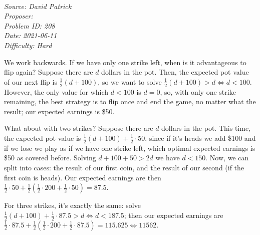 \SSbreak\\
\emph{Source: David Patrick}\\
\emph{Proposer: \Paiya}\\ %
\emph{Problem ID: 208}\\
\emph{Date: 2021-06-11}\\
\emph{Difficulty: Hard}\\
\SSbreak

\bigskip

\begin{solution}\hfil\medskip
  
    We work backwards. If we have only one strike left, when is it advantageous to flip again? Suppose there are $d$ dollars in the pot. Then, the expected 
	pot value of our next flip is $\frac{1}{2}(d + 100)$, so we want to solve $\frac{1}{2}(d + 100) > d \iff d < 100$. However, the only value for which $d < 100$
	is $d = 0$, so, with only one strike remaining, the best strategy is to flip once and end the game, no matter what the result; our expected earnings is \$50. \medskip

	What about with two strikes? Suppose there are $d$ dollars in the pot. This time, the expected pot value is $\frac{1}{2}(d + 100) + \frac{1}{2} \cdot 50$,
	since if it's heads we add \$100 and if we lose we play as if we have one strike left, which optimal expected earnings is \$50 as covered before.
	Solving $d + 100 + 50 > 2d$ we have $d < 150$. Now, we can split into cases: the result of our first coin, and the result of our second (if the first coin is heads).
	Our expected earnings are then $\frac{1}{2} \cdot 50 + \frac{1}{2}\left(\frac{1}{2} \cdot 200 + \frac{1}{2} \cdot 50\right) = 87.5$. \medskip
	
	For three strikes, it's exactly the same: solve $\frac{1}{2}(d + 100) + \frac{1}{2} \cdot 87.5 > d \iff d < 187.5$; then our expected earnings are 
	$\frac{1}{2} \cdot 87.5 + \frac{1}{2}\left(\frac{1}{2} \cdot 200 + \frac{1}{2} \cdot 87.5 \right) = 115.625 \iff \boxed{11562}.$
\end{solution}\bigskip

